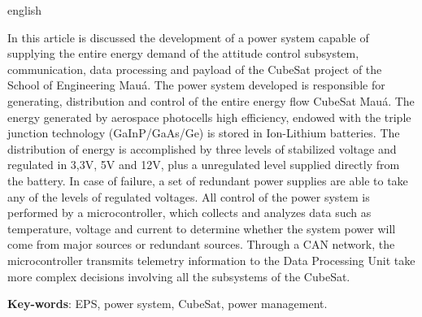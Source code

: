 \documentclass[
	12pt,				%
	openright,			%
	oneside,			%
	a4paper,			%
	english,			%
	french,				%
	spanish,			%
	brazil,				%
	oldfontcommands
	]{abntex2}
\begin{document}
\begin{resumo}[Abstract]
 \begin{otherlanguage*}{english}
 
	In this article is discussed the development of a power system capable of supplying the entire energy demand of the attitude control subsystem, communication, data processing and payload of the CubeSat project of the School of Engineering Mauá. The power system developed is responsible for generating, distribution and control of the entire energy flow CubeSat Mauá. The energy generated by aerospace photocells high efficiency, endowed with the triple junction technology (GaInP/GaAs/Ge) is stored in Ion-Lithium batteries. The distribution of energy is accomplished by three levels of stabilized voltage and regulated in 3,3V, 5V and 12V, plus a unregulated level supplied directly from the battery. In case of failure, a set of redundant power supplies are able to take any of the levels of regulated voltages. All control of the power system is performed by a microcontroller, which collects and analyzes data such as temperature, voltage and current to determine whether the system power will come from major sources or redundant sources. Through a CAN network, the microcontroller transmits telemetry information to the Data Processing Unit take more complex decisions involving all the subsystems of the CubeSat.

   \vspace{\onelineskip}
 
   \noindent 
   \textbf{Key-words}: EPS, power system, CubeSat, power management.
 \end{otherlanguage*}
\end{resumo}

\listoffigures*
\cleardoublepage

\listoftables*
\cleardoublepage
\end{document}
